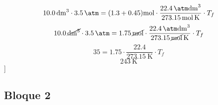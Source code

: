 \documentclass[../practica.root.tex]{subfiles}
\begin{document}
\begin{enumerate}
\begin{enumerate}
\begin{center}
\[				            \SI{10,0}{\dm\cubed}\cdot\SI{3,5}{\atm}
				            = (\num{1,3} + \num{0,45})\si{\mole}
				            \cdot\frac{\SI{22,4}{\atm\dm\cubed}}{\SI{273,15}{\mole\kelvin}}
				            \cdot T_f
			            \]
			            \[
				            \SI{10,0}{\cancel\dm\cubed}\cdot\SI{3,5}{\cancel\atm}
				            = \SI{1,75}{\cancel\mole}
				            \cdot\frac{\SI{22,4}{\cancel\atm\cancel\dm\cubed}}{\SI{273,15}{\cancel\mole\kelvin}}
				            \cdot T_f
			            \]
			            \[ \num{35} = \SI{1,75}\cdot\frac{\num{22,4}}{\SI{273,15}{\kelvin}}\cdot T_f \]
			            \[ \boxed{\SI{243}{\kelvin}} \]]
		            \end{center}
	      \end{enumerate}
\end{enumerate}
\subsection{Bloque 2}
\end{document}
